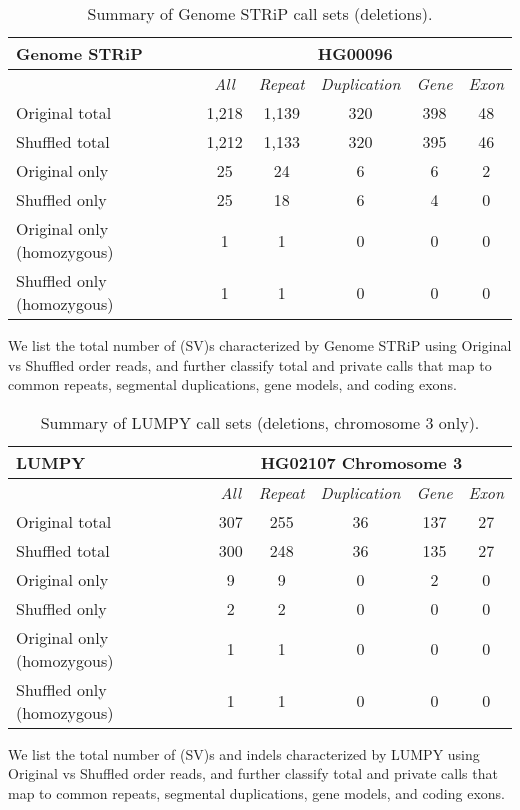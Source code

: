 \begin{table}[htb]
\caption{ Summary of Genome STRiP call sets (deletions). }
\begin{center}
\begin{tabular}{|l|c||c|c|c|c|}
\hline
{\bf Genome STRiP} & \multicolumn{5}{|c|}{\bf HG00096} \\
\hline
\cline{2-6}
{\bf} & {\it All} & {\it Repeat} & {\it Duplication} & {\it Gene} & {\it Exon} \\
\hline
Original total & 1,218 & 1,139 & 320 & 398 & 48 \\
\hline
Shuffled total & 1,212 & 1,133 & 320 & 395 & 46 \\
\hline
Original only & 25 & 24 & 6 & 6 & 2\\ 
\hline
Shuffled only & 25 & 18 & 6 & 4 & 0\\
\hline
Original only (homozygous) & 1 & 1 & 0 & 0 & 0\\ 
\hline
Shuffled only (homozygous) & 1 & 1 & 0 & 0 & 0\\  
\hline
\end{tabular}
\end{center}
{\footnotesize We list the total number of (SV)s characterized by Genome STRiP using Original vs Shuffled order reads, 
and further classify total and private calls that map to common repeats, segmental duplications, gene models, and coding exons.}
\label{supptab:orig-vs-shuf-svtoolkit}
\end{table}

\begin{table}[htb]
\caption{ Summary of LUMPY call sets (deletions, chromosome 3 only). }
\begin{center}
\begin{tabular}{|l|c||c|c|c|c|}
\hline
{\bf LUMPY} & \multicolumn{5}{|c|}{\bf HG02107 Chromosome 3} \\
\hline
\cline{2-6}
{\bf} & {\it All} & {\it Repeat} & {\it Duplication} & {\it Gene} & {\it Exon} \\
\hline
Original total & 307 & 255 & 36 & 137 & 27 \\
\hline
Shuffled total & 300 & 248 & 36 & 135 & 27 \\
\hline
Original only & 9 & 9 & 0 & 2 & 0\\ 
\hline
Shuffled only & 2 & 2 & 0 & 0 & 0 \\
\hline
Original only (homozygous) & 1 & 1 & 0 & 0 & 0\\ 
\hline
Shuffled only (homozygous) & 1 & 1 & 0 & 0 & 0\\  
\hline
\end{tabular}
\end{center}
{\footnotesize We list the total number of (SV)s and indels characterized by LUMPY using Original vs Shuffled order reads, 
and further classify total and private calls that map to common repeats, segmental duplications, gene models, and coding exons.}
\label{supptab:orig-vs-shuf-lumpy}
\end{table}

